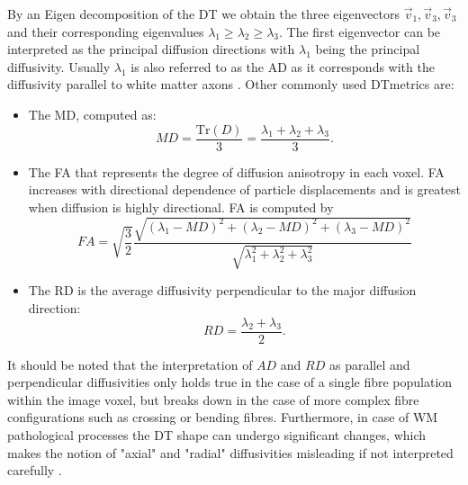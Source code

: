 By an Eigen decomposition of the {\gls{DT}} we obtain the three eigenvectors $\vec{v}_1, \vec{v}_3, \vec{v}_3$ and their corresponding eigenvalues $\lambda_1\ge\lambda_2\ge\lambda_3$. The first eigenvector can be interpreted as the principal diffusion directions with $\lambda_1$ being the principal diffusivity. Usually $\lambda_1$ is also referred to as the {\gls{AD}} as it corresponds with the diffusivity parallel to white matter axons \citep{Basser:1996}. Other commonly used {\gls{DT}}metrics are:
\begin{itemize}
	\item The {\gls{MD}}, computed as:
	\begin{equation}
		MD = \frac{\mbox{Tr}(D)}{3} = \frac{\lambda_1 + \lambda_2 +\lambda_3}{3}.
	\end{equation}
	\item The {\gls{FA}} that represents the degree of diffusion anisotropy in each voxel.  {\gls{FA}} increases
	with directional dependence of particle displacements and is greatest when diffusion is highly directional.  {\gls{FA}} is computed by
	\begin{equation}
		FA = \sqrt{\frac{3}{2}}\frac{\sqrt{(\lambda_1-MD)^2+(\lambda_2-MD)^2+(\lambda_3-MD)^2}}{\sqrt{\lambda_1^2+\lambda_2^2+\lambda_3^2}}
	\end{equation}
	\item The {\gls{RD}} is the average diffusivity perpendicular to the major diffusion direction:
	\begin{equation}
		RD = \frac{\lambda_2 + \lambda_3}{2}.
	\end{equation}
\end{itemize}
It should be noted that the interpretation of $AD$ and $RD$ as parallel and perpendicular diffusivities only holds true in the case of a single fibre population within the image voxel, but breaks down in the case of more complex fibre configurations such as crossing or bending fibres. Furthermore, in case of WM  pathological processes the DT shape can undergo significant changes, which makes the notion of  "axial" and "radial" diffusivities misleading if not interpreted carefully \citep{Wheeler-Kingshott:inpress}. 

